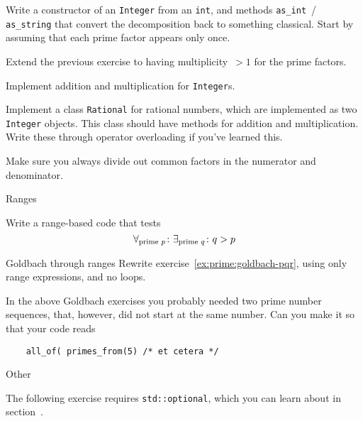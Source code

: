 \begin{exercise}
  Write a constructor of an \lstinline{Integer} from an \lstinline{int},
  and methods \lstinline{as_int}~/ \lstinline{as_string} that convert the
  decomposition back to something classical. Start by assuming that each prime factor
  appears only once.
\end{exercise}

\begin{exercise}
  Extend the previous exercise to having multiplicity~$>1$ for the prime factors.
\end{exercise}

Implement addition and multiplication for \lstinline{Integer}s.

Implement a class \lstinline{Rational} for rational numbers, which
are implemented as two \lstinline{Integer} objects.
This class should have methods for addition and multiplication.
Write these through operator overloading if you've learned this.

Make sure you always divide out common factors in the numerator and denominator.

 {Ranges}


\begin{exercise}
  Write a range-based code that tests
  \[ \forall_{\hbox{\scriptsize prime $p$}}\colon
       \exists_{\hbox{\scriptsize prime $q$}}\colon
       q>p
  \]
\end{exercise}

\begin{exercise}{Goldbach through ranges}
  \label{ex:goldbach-range20}
  Rewrite exercise~\ref{ex:prime:goldbach-pqr},
  using only range expressions, and no loops.
\end{exercise}

\begin{exercise}
  In the above Goldbach exercises you probably needed two
  prime number sequences, that, however, did not start at the same number.
  Can you make it so that your code reads
  \begin{lstlisting}
    all_of( primes_from(5) /* et cetera */
  \end{lstlisting}
\end{exercise}

 {Other}

The following exercise requires \lstinline+std::optional+,
which you can learn about in section~.

